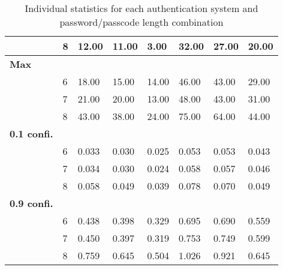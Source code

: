 \documentclass[british,11pt,a4paper]{article}
\begin{document}
\begin{appendices}
\begin{table}[h]
\begin{tabular}{|l|l|l|l|l|l|l|l|}
		 & 8 & 12.00 & 11.00 & 3.00 & 32.00 & 27.00 & 20.00 \\ \hline
		\textbf{Max} &  &  &  &  &  &  &  \\ \hline
		 & 6 & 18.00 & 15.00 & 14.00 & 46.00 & 43.00 & 29.00 \\ \hline
		 & 7 & 21.00 & 20.00 & 13.00 & 48.00 & 43.00 & 31.00 \\ \hline
		 & 8 & 43.00 & 38.00 & 24.00 & 75.00 & 64.00 & 44.00 \\ \hline
		\textbf{0.1 confi.} &  &  &  &  &  &  &  \\ \hline
		 & 6 & 0.033 & 0.030 & 0.025 & 0.053 & 0.053 & 0.043 \\ \hline
		 & 7 & 0.034 & 0.030 & 0.024 & 0.058 & 0.057 & 0.046 \\ \hline
		 & 8 & 0.058 & 0.049 & 0.039 & 0.078 & 0.070 & 0.049 \\ \hline
		\textbf{0.9 confi.} &  &  &  &  &  &  &  \\ \hline
		 & 6 & 0.438 & 0.398 & 0.329 & 0.695 & 0.690 & 0.559 \\ \hline
		 & 7 & 0.450 & 0.397 & 0.319 & 0.753 & 0.749 & 0.599 \\ \hline
		 & 8 & 0.759 & 0.645 & 0.504 & 1.026 & 0.921 & 0.645 \\ \hline
		\end{tabular}
		\caption{Individual statistics for each authentication system and password/passcode length combination}
	\end{table}
	\clearpage


\end{appendices}
\end{document}
